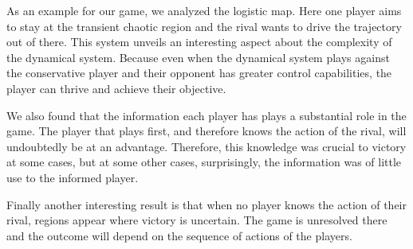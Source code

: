 As an example for our game, we analyzed the logistic map. Here one player aims to stay at the transient chaotic region and the rival wants to drive the trajectory out of there. This system unveils an interesting aspect about the complexity of the dynamical system. Because even when the dynamical system plays against the conservative player and their opponent has greater control capabilities, the player can thrive and achieve their objective.

We also found that the information each player has plays a substantial role in the game. The player that plays first, and therefore knows the action of the rival, will undoubtedly be at an advantage. Therefore, this knowledge was crucial to victory at some cases, but at some other cases, surprisingly, the information was of little use to the informed player.

Finally another interesting result is that when no player knows the action of their rival, regions appear where victory is uncertain. The game is unresolved there and the outcome will depend on the sequence of actions of the players.



